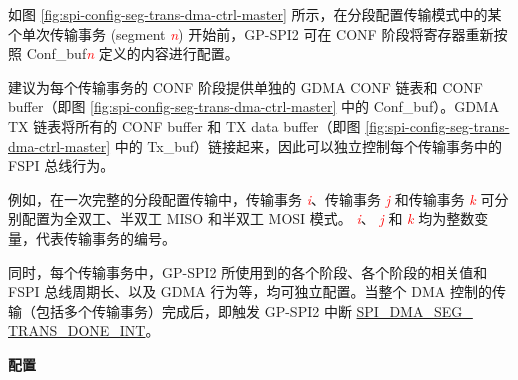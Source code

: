 \documentclass[main\_\_CN.tex]{subfiles}
\begin{document}
如图 \ref{fig:spi-config-seg-trans-dma-ctrl-master} 所示，在分段配置传输模式中的某个单次传输事务 (segment \textcolor{red}{\it{n}}) 开始前，GP-SPI2 可在 CONF 阶段将寄存器重新按照 Conf\_buf\textcolor{red}{\it{n}}  定义的内容进行配置。

建议为每个传输事务的 CONF 阶段提供单独的 GDMA CONF 链表和 CONF buffer（即图 \ref{fig:spi-config-seg-trans-dma-ctrl-master} 中的 Conf\_buf）。GDMA TX 链表将所有的 CONF buffer 和 TX data buffer（即图 \ref{fig:spi-config-seg-trans-dma-ctrl-master} 中的 Tx\_buf）链接起来，因此可以独立控制每个传输事务中的 FSPI 总线行为。

例如，在一次完整的分段配置传输中，传输事务 \textcolor{red}{\it i}、传输事务 \textcolor{red}{\it j} 和传输事务 \textcolor{red}{\it k} 可分别配置为全双工、半双工 MISO 和半双工 MOSI 模式。 \textcolor{red}{\it i}、 \textcolor{red}{\it j} 和  \textcolor{red}{\it k} 均为整数变量，代表传输事务的编号。

同时，每个传输事务中，GP-SPI2 所使用到的各个阶段、各个阶段的相关值和 FSPI 总线周期长、以及 GDMA 行为等，均可独立配置。当整个 DMA 控制的传输（包括多个传输事务）完成后，即触发 GP-SPI2 中断 \hyperref[int:SPIDMASEGTRANSDONEINT]{SPI\_DMA\_SEG\_\\TRANS\_DONE\_INT}。

\textbf{配置}
\end{document}
